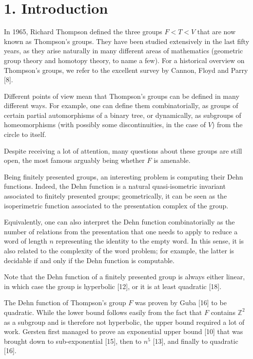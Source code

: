 \section*{1. Introduction}
In 1965, Richard Thompson defined the three groups $F<T<V$ that are now known as Thompson's groups. They have been studied extensively in the last fifty years, as they arise naturally in many different areas of mathematics (geometric group theory and homotopy theory, to name a few). For a historical overview on Thompson's groups, we refer to the excellent survey by Cannon, Floyd and Parry [8].

Different points of view mean that Thompson's groups can be defined in many different ways. For example, one can define them combinatorially, as groups of certain partial automorphisms of a binary tree, or dynamically, as subgroups of homeomorphisms (with possibly some discontinuities, in the case of $V$) from the circle to itself.

Despite receiving a lot of attention, many questions about these groups are still open, the most famous arguably being whether $F$ is amenable.

Being finitely presented groups, an interesting problem is computing their Dehn functions. Indeed, the Dehn function is a natural quasi-isometric invariant associated to finitely presented groups; geometrically, it can be seen as the isoperimetric function associated to the presentation complex of the group.

Equivalently, one can also interpret the Dehn function combinatorially as the number of relations from the presentation that one needs to apply to reduce a word of length $n$ representing the identity to the empty word. In this sense, it is also related to the complexity of the word problem; for example, the latter is decidable if and only if the Dehn function is computable.

Note that the Dehn function of a finitely presented group is always either linear, in which case the group is hyperbolic [12], or it is at least quadratic [18].

The Dehn function of Thompson's group $F$ was proven by Guba [16] to be quadratic. While the lower bound follows easily from the fact that $F$ contains $\mathbb{Z}^2$ as a subgroup and is therefore not hyperbolic, the upper bound required a lot of work. Gersten first managed to prove an exponential upper bound [10] that was brought down to sub-exponential [15], then to $n^5$ [13], and finally to quadratic [16].

